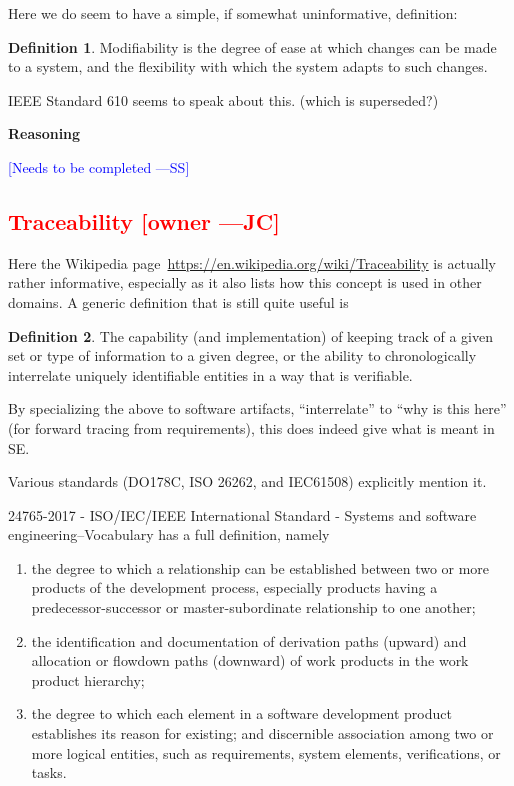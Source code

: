 \documentclass[letterpaper,cleveref]{lipics-v2019}
\newcommand{\authornote}[3]{\textcolor{#1}{[#3 ---#2]}}
\newcommand{\authornote}[3]{}
\newcommand{\wss}[1]{\authornote{blue}{SS}{#1}} %
\newcommand{\jc}[1]{\authornote{red}{JC}{#1}} %
\newcommand{\notdone}[1]{\textcolor{red}{#1}}
\theoremstyle{definition}
\newtheorem{defn}{Definition}
\begin{document}
Here we do seem to have a simple, if somewhat uninformative, definition:

\begin{defn}
	Modifiability is the degree of ease at which changes can be made to a system,
	and the flexibility with which the system adapts to such changes.
\end{defn}

IEEE Standard 610 seems to speak about this. (which is superseded?)

\noindent \textbf{Reasoning}

\wss{Needs to be completed}

\subsection{\notdone{Traceability} \jc{owner}}

Here the Wikipedia page~\url{https://en.wikipedia.org/wiki/Traceability} is
actually rather informative, especially as it also lists how this concept is
used in other domains.  A generic definition that is still quite useful is
\begin{defn}
	The capability (and implementation) of keeping track of a given set or type of
	information to a given degree, or the ability to chronologically interrelate
	uniquely identifiable entities in a way that is verifiable.
\end{defn}
By specializing the above to software artifacts, ``interrelate'' to 
``why is this here'' (for forward tracing from requirements), this does
indeed give what is meant in SE.

Various standards (DO178C, ISO 26262, and IEC61508) explicitly mention it.

24765-2017 - ISO/IEC/IEEE International Standard - Systems and software
engineering--Vocabulary
has a full definition, namely
\begin{enumerate}
	\item the degree to which a relationship can be established between two or more
	products of the development process, especially products having a
	predecessor-successor or master-subordinate relationship to one another;
	\item
	the identification and documentation of derivation paths (upward) and
	allocation or flowdown paths (downward) of work products in the work product
	hierarchy;
	\item the degree to which each element in a software development
	product establishes its reason for existing; and discernible association
	among two or more logical entities, such as requirements, system elements,
	verifications, or tasks.
\end{enumerate}
\end{document}
